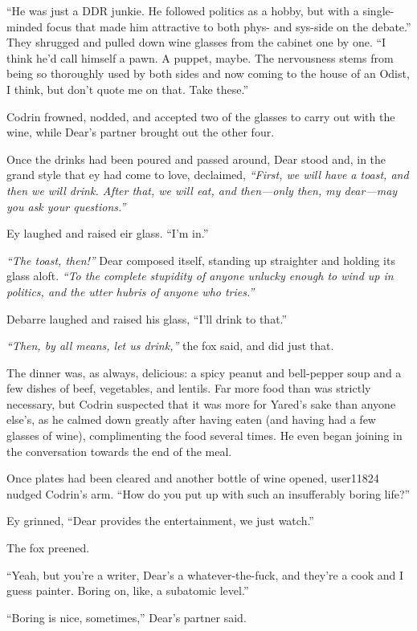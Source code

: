 ``He was just a DDR junkie. He followed politics as a hobby, but with a single-minded focus that made him attractive to both phys- and sys-side on the debate.'' They shrugged and pulled down wine glasses from the cabinet one by one. ``I think he'd call himself a pawn. A puppet, maybe. The nervousness stems from being so thoroughly used by both sides and now coming to the house of an Odist, I think, but don't quote me on that. Take these.''

Codrin frowned, nodded, and accepted two of the glasses to carry out with the wine, while Dear's partner brought out the other four.

Once the drinks had been poured and passed around, Dear stood and, in the grand style that ey had come to love, declaimed, \emph{``First, we will have a toast, and then we will drink. After that, we will eat, and then---only then, my dear---may you ask your questions.''}

Ey laughed and raised eir glass. ``I'm in.''

\emph{``The toast, then!''} Dear composed itself, standing up straighter and holding its glass aloft. \emph{``To the complete stupidity of anyone unlucky enough to wind up in politics, and the utter hubris of anyone who tries.''}

Debarre laughed and raised his glass, ``I'll drink to that.''

\emph{``Then, by all means, let us drink,''} the fox said, and did just that.

The dinner was, as always, delicious: a spicy peanut and bell-pepper soup and a few dishes of beef, vegetables, and lentils. Far more food than was strictly necessary, but Codrin suspected that it was more for Yared's sake than anyone else's, as he calmed down greatly after having eaten (and having had a few glasses of wine), complimenting the food several times. He even began joining in the conversation towards the end of the meal.

Once plates had been cleared and another bottle of wine opened, user11824 nudged Codrin's arm. ``How do you put up with such an insufferably boring life?''

Ey grinned, ``Dear provides the entertainment, we just watch.''

The fox preened.

``Yeah, but you're a writer, Dear's a whatever-the-fuck, and they're a cook and I guess painter. Boring on, like, a subatomic level.''

``Boring is nice, sometimes,'' Dear's partner said.

